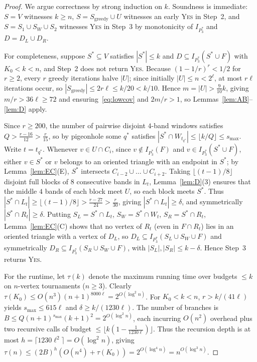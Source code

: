 \documentclass[11pt]{article}
\theoremstyle{remark}
\begin{document}
\begin{proof}
We argue correctness by strong induction on $k$. Soundness is immediate: $S = V$ witnesses $k \ge n$, $S = S_{\mathrm{greedy}} \cup U$ witnesses an early \textsc{Yes} in Step~2, and $S = S_1 \cup S_W \cup S_2$ witnesses \textsc{Yes} in Step~3 by monotonicity of $I_{P_3^*}$ and $D = D_L \cup D_R$.

For completeness, suppose $S^* \subseteq V$ satisfies $|S^*| \le k$ and $D \subseteq I_{P_3^*}(S^* \cup F)$ with $K_0 < k < n$, and Step~2 does not return \textsc{Yes}. Because $(1 - 1/r)^r < 1/2$ for $r \ge 2$, every $r$ greedy iterations halve $|U|$; since initially $|U| \le n < 2^\ell$, at most $r \ell$ iterations occur, so $|S_{\mathrm{greedy}}| \le 2r\ell \le k/20 < k/10$. Hence $m = |U| > \frac{9}{10}k$, giving $m/r > 36\ell \ge 72$ and ensuring~\eqref{eq:lowcov} and $2m/r > 1$, so Lemmas~\ref{lem:AB}--\ref{lem:D} apply.

Since $r \ge 200$, the number of pairwise disjoint $4$-band windows satisfies $Q > \frac{r - 16}{12} > \frac{r}{15}$, so by pigeonhole some $q^*$ satisfies $|S^* \cap W_{t_{q^*}}| \le \lfloor k/Q \rfloor \le s_{\max}$. Write $t = t_{q^*}$. Whenever $v \in U \cap C_i$, since $v \notin I_{P_3^*}(F)$ and $v \in I_{P_3^*}(S^* \cup F)$, either $v \in S^*$ or $v$ belongs to an oriented triangle with an endpoint in $S^*$; by Lemma~\ref{lem:EC}(E), $S^*$ intersects $C_{i-2} \cup \dots \cup C_{i+2}$. Taking $\lfloor (t-1)/8 \rfloor$ disjoint full blocks of $8$ consecutive bands in $L_t$, Lemma~\ref{lem:D}(3) ensures that the middle $4$ bands of each block meet $U$, so each block meets $S^*$. Thus $|S^* \cap L_t| \ge \lfloor (t-1)/8 \rfloor > \frac{r - 27}{24} > \frac{r}{30}$, giving $|S^* \cap L_t| \ge \delta$, and symmetrically $|S^* \cap R_t| \ge \delta$. Putting $S_L = S^* \cap L_t$, $S_W = S^* \cap W_t$, $S_R = S^* \cap R_t$, Lemma~\ref{lem:EC}(C) shows that no vertex of $R_t$ (even in $F \cap R_t$) lies in an oriented triangle with a vertex of $D_L$, so $D_L \subseteq I_{P_3^*}(S_L \cup S_W \cup F)$ and symmetrically $D_R \subseteq I_{P_3^*}(S_R \cup S_W \cup F)$, with $|S_L|, |S_R| \le k - \delta$. Hence Step~3 returns \textsc{Yes}.

For the runtime, let $\tau(k)$ denote the maximum running time over budgets $\le k$ on $n$-vertex tournaments ($n \ge 3$). Clearly $\tau(K_0) \le O(n^3)(n+1)^{8000\ell} = 2^{O(\log^2 n)}$. For $K_0 < k < n$, $r > k/(41\ell)$ yields $s_{\max} \le 615\ell$ and $\delta \ge k/(1230\ell)$. The number of branches is $B \le Q(n+1)^{s_{\max}}(k+1)^2 = 2^{O(\log^2 n)}$, each incurring $O(n^2)$ overhead plus two recursive calls of budget $\le \lfloor k(1 - \frac{1}{1230\ell}) \rfloor$. Thus the recursion depth is at most $h = \lceil 1230 \ell^2 \rceil = O(\log^2 n)$, giving $\tau(n) \le (2B)^h (O(n^4) + \tau(K_0)) = 2^{O(\log^4 n)} = n^{O(\log^3 n)}$.
\end{proof}
\end{document}
